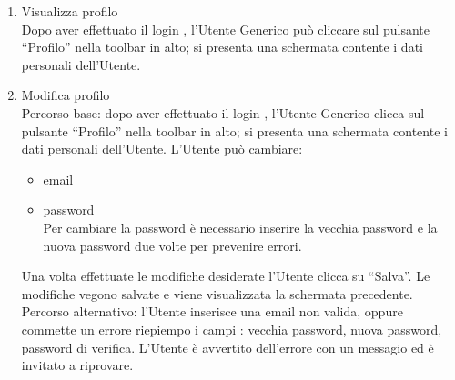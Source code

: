 \begin{enumerate}
\begin{enumerate}
 \item Visualizza profilo\\ \label{UC_view_profile}
    Dopo aver effettuato il login , l'Utente Generico può cliccare sul pulsante ``Profilo'' nella toolbar in alto; si presenta una schermata contente i dati personali dell'Utente.
 \item Modifica profilo\\ \label{UC_edit_profile}
  Percorso base:
  dopo aver effettuato il login , l'Utente Generico clicca sul pulsante ``Profilo'' nella toolbar in alto; si presenta una schermata contente i dati personali dell'Utente.
  L'Utente può cambiare:
  \begin{itemize}
   \item email
   \item password\\
    Per cambiare la password è necessario inserire la vecchia password e la nuova password due volte per prevenire errori.
  \end{itemize}

  Una volta effettuate le modifiche desiderate l'Utente clicca su ``Salva''. Le modifiche vegono salvate e viene visualizzata la schermata precedente.\\
  
  Percorso alternativo:
  l'Utente inserisce una email non valida, oppure commette un errore riepiempo i campi : vecchia password, nuova password, password di verifica. L'Utente è avvertito dell'errore con un messagio ed è invitato a riprovare.
  

\end{enumerate}




\end{enumerate}
